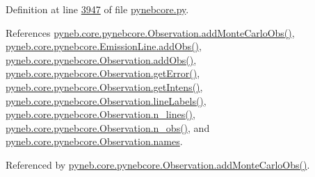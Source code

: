 Definition at line \hyperlink{pynebcore_8py_source_l03947}{3947} of file \hyperlink{pynebcore_8py_source}{pynebcore.\+py}.



References \hyperlink{pynebcore_8py_source_l03947}{pyneb.\+core.\+pynebcore.\+Observation.\+add\+Monte\+Carlo\+Obs()}, \hyperlink{pynebcore_8py_source_l03347}{pyneb.\+core.\+pynebcore.\+Emission\+Line.\+add\+Obs()}, \hyperlink{pynebcore_8py_source_l03467}{pyneb.\+core.\+pynebcore.\+Observation.\+add\+Obs()}, \hyperlink{pynebcore_8py_source_l03809}{pyneb.\+core.\+pynebcore.\+Observation.\+get\+Error()}, \hyperlink{pynebcore_8py_source_l03782}{pyneb.\+core.\+pynebcore.\+Observation.\+get\+Intens()}, \hyperlink{pynebcore_8py_source_l03493}{pyneb.\+core.\+pynebcore.\+Observation.\+line\+Labels()}, \hyperlink{pynebcore_8py_source_l03502}{pyneb.\+core.\+pynebcore.\+Observation.\+n\+\_\+lines()}, \hyperlink{pynebcore_8py_source_l03520}{pyneb.\+core.\+pynebcore.\+Observation.\+n\+\_\+obs()}, and \hyperlink{pynebcore_8py_source_l03421}{pyneb.\+core.\+pynebcore.\+Observation.\+names}.



Referenced by \hyperlink{pynebcore_8py_source_l03947}{pyneb.\+core.\+pynebcore.\+Observation.\+add\+Monte\+Carlo\+Obs()}.


